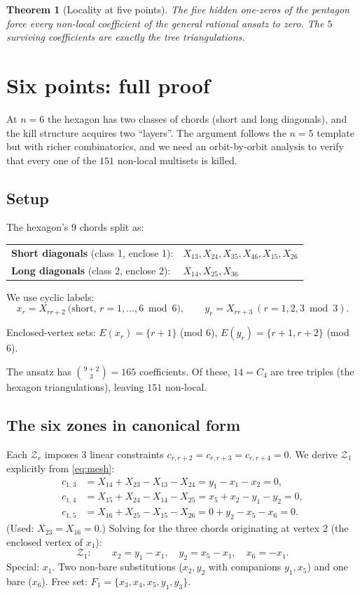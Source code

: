 \documentclass[11pt]{article}
\newcommand{\X}[2]{X_{#1#2}}
\newcommand{\Z}{\mathcal{Z}}
\newcommand{\Enc}{E}
\newtheorem{theorem}{Theorem}
\theoremstyle{definition}
\begin{document}
\begin{theorem}[Locality at five points]
The five hidden one-zeros of the pentagon force every non-local coefficient
of the general rational ansatz to zero. The $5$ surviving coefficients are
exactly the tree triangulations.
\end{theorem}

\section{Six points: full proof}
\label{sec:n6}

At $n=6$ the hexagon has two classes of chords (short and long diagonals),
and the kill structure acquires two ``layers''. The argument follows the
$n=5$ template but with richer combinatorics, and we need an orbit-by-orbit
analysis to verify that every one of the $151$ non-local multisets is killed.

\subsection{Setup}

The hexagon's $9$ chords split as:
\begin{center}
\begin{tabular}{ll}
\textbf{Short diagonals} (class 1, enclose 1): &
$\X{1}{3},\X{2}{4},\X{3}{5},\X{4}{6},\X{1}{5},\X{2}{6}$\\
\textbf{Long diagonals} (class 2, enclose 2): &
$\X{1}{4},\X{2}{5},\X{3}{6}$
\end{tabular}
\end{center}

We use cyclic labels:
\[
x_r = \X{r}{r+2}\ \text{(short, }r=1,\ldots,6\bmod 6),\qquad y_r = \X{r}{r+3}\ (r=1,2,3\bmod 3).
\]

Enclosed-vertex sets: $\Enc(x_r) = \{r+1\}$ (mod 6), $\Enc(y_r) = \{r+1, r+2\}$
(mod 6).

The ansatz has $\binom{9+2}{3} = 165$ coefficients. Of these, $14=C_4$ are
tree triples (the hexagon triangulations), leaving $151$ non-local.

\subsection{The six zones in canonical form}

Each $\Z_r$ imposes $3$ linear constraints $c_{r,r+2}=c_{r,r+3}=c_{r,r+4}=0$.
We derive $\Z_1$ explicitly from \eqref{eq:mesh}:
\begin{align*}
c_{1,3} &= \X{1}{4}+\X{2}{3}-\X{1}{3}-\X{2}{4} = y_1-x_1-x_2=0,\\
c_{1,4} &= \X{1}{5}+\X{2}{4}-\X{1}{4}-\X{2}{5} = x_5+x_2-y_1-y_2=0,\\
c_{1,5} &= \X{1}{6}+\X{2}{5}-\X{1}{5}-\X{2}{6} = 0+y_2-x_5-x_6=0.
\end{align*}
(Used: $\X{2}{3}=\X{1}{6}=0$.) Solving for the three chords originating at
vertex $2$ (the enclosed vertex of $x_1$):
\[
\Z_1:\qquad x_2 = y_1 - x_1,\quad y_2 = x_5 - x_1,\quad x_6 = -x_1.
\]
Special: $x_1$. Two non-bare substitutions ($x_2, y_2$ with companions
$y_1, x_5$) and one bare ($x_6$). Free set:
$F_1 = \{x_3, x_4, x_5, y_1, y_3\}$.
\end{document}
